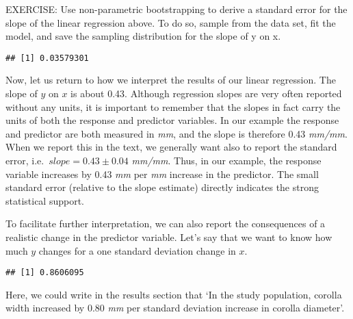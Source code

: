 \documentclass[
]{article}
\newenvironment{Shaded}{\begin{snugshade}}{\end{snugshade}}
\newcommand{\DecValTok}[1]{\textcolor[rgb]{0.00,0.00,0.81}{#1}}
\newcommand{\FunctionTok}[1]{\textcolor[rgb]{0.00,0.00,0.00}{#1}}
\newcommand{\NormalTok}[1]{#1}
\newcommand{\OtherTok}[1]{\textcolor[rgb]{0.56,0.35,0.01}{#1}}
\newcommand{\SpecialCharTok}[1]{\textcolor[rgb]{0.00,0.00,0.00}{#1}}
\begin{document}
EXERCISE: Use non-parametric bootstrapping to derive a standard error
for the slope of the linear regression above. To do so, sample from the
data set, fit the model, and save the sampling distribution for the
slope of y on x.

\begin{verbatim}
## [1] 0.03579301
\end{verbatim}

Now, let us return to how we interpret the results of our linear
regression. The slope of \(y\) on \(x\) is about 0.43. Although
regression slopes are very often reported without any units, it is
important to remember that the slopes in fact carry the units of both
the response and predictor variables. In our example the response and
predictor are both measured in \emph{mm}, and the slope is therefore
0.43 \emph{mm/mm}. When we report this in the text, we generally want
also to report the standard error, i.e.~\(slope = 0.43 \pm{0.04}\)
\emph{mm/mm}. Thus, in our example, the response variable increases by
0.43 \emph{mm} per \emph{mm} increase in the predictor. The small
standard error (relative to the slope estimate) directly indicates the
strong statistical support.

To facilitate further interpretation, we can also report the
consequences of a realistic change in the predictor variable. Let's say
that we want to know how much \(y\) changes for a one standard deviation
change in \(x\).

\begin{Shaded}
\end{Shaded}

\begin{verbatim}
## [1] 0.8606095
\end{verbatim}

Here, we could write in the results section that `In the study
population, corolla width increased by 0.80 \emph{mm} per standard
deviation increase in corolla diameter'.
\end{document}
